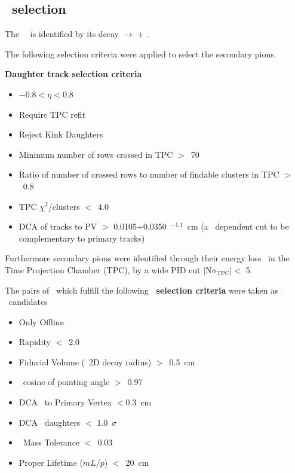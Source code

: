 \subsection{\VZERO~selection}
\label{par:5.3b} 
The \VZERO~\kshort~is identified by its decay \kshort $\rightarrow$  \pip + \pim.

The following selection criteria were applied to select the secondary pions. 
 
\textbf{Daughter track selection criteria}
\begin{itemize}
\item $-0.8<\eta <0.8$
\item Require TPC refit
\item Reject Kink Daughters
\item Minimum number of rows crossed in TPC $>$~70
\item Ratio of number of crossed rows to number of findable clusters in TPC $>$~0.8
\item TPC $\chi^{2}$/clusters $<$~4.0
\item DCA of tracks to PV $>$ 0.0105+0.0350~\pT$^{-1.1}$~cm  (a \pT~dependent cut to be complementary to primary tracks)
\end{itemize}

Furthermore secondary pions were identified through their energy loss \dedx~in the Time Projection Chamber (TPC), by a wide PID cut $\left | \mathrm{N\sigma}_{\mathrm{TPC}} \right | < $ 5.

The pairs of \pip\pim~which fulfill the following \textbf{\VZERO~selection criteria} were taken as \kshort~candidates

\begin{itemize}
\item Only Offline \VZERO
\item Rapidity \modrap $<$~2.0
\item Fiducial Volume (\VZERO~2D decay radius) $>$~0.5~cm
\item \VZERO~cosine of pointing angle $>$~0.97
\item DCA \VZERO~to Primary Vertex $<$0.3~cm
\item DCA \VZERO~daughters $<$ 1.0~$\sigma$
\item \VZERO~Mass Tolerance $<$~0.03~\gmass 
\item Proper Lifetime ($mL/p$) $<$~20~cm 
\end{itemize}

